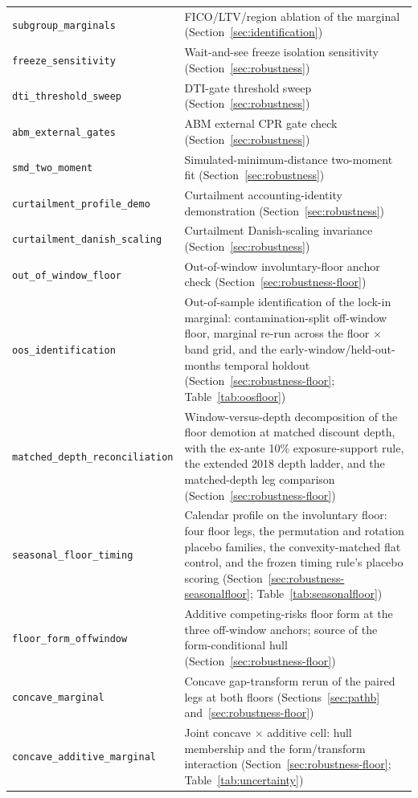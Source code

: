 \documentclass[12pt]{article}
\begin{document}
\begin{table}[H]
\begin{threeparttable}
\begin{tabular}{@{}p{5.4cm}p{8.8cm}@{}}
\texttt{subgroup\_marginals} & FICO/LTV/region ablation of the marginal (Section~\ref{sec:identification}) \\
\texttt{freeze\_sensitivity} & Wait-and-see freeze isolation sensitivity (Section~\ref{sec:robustness}) \\
\texttt{dti\_threshold\_sweep} & DTI-gate threshold sweep (Section~\ref{sec:robustness}) \\
\texttt{abm\_external\_gates} & ABM external CPR gate check (Section~\ref{sec:robustness}) \\
\texttt{smd\_two\_moment} & Simulated-minimum-distance two-moment fit (Section~\ref{sec:robustness}) \\
\texttt{curtailment\_profile\_demo} & Curtailment accounting-identity demonstration (Section~\ref{sec:robustness}) \\
\texttt{curtailment\_danish\_scaling} & Curtailment Danish-scaling invariance (Section~\ref{sec:robustness}) \\
\texttt{out\_of\_window\_floor} & Out-of-window involuntary-floor anchor check (Section~\ref{sec:robustness-floor}) \\
\texttt{oos\_identification} & Out-of-sample identification of the lock-in marginal: contamination-split off-window floor, marginal re-run across the floor $\times$ band grid, and the early-window/held-out-months temporal holdout (Section~\ref{sec:robustness-floor}; Table~\ref{tab:oosfloor}) \\
\texttt{matched\_depth\_reconciliation} & Window-versus-depth decomposition of the floor demotion at matched discount depth, with the ex-ante 10\% exposure-support rule, the extended 2018 depth ladder, and the matched-depth leg comparison (Section~\ref{sec:robustness-floor}) \\
\texttt{seasonal\_floor\_timing} & Calendar profile on the involuntary floor: four floor legs, the permutation and rotation placebo families, the convexity-matched flat control, and the frozen timing rule's placebo scoring (Section~\ref{sec:robustness-seasonalfloor}; Table~\ref{tab:seasonalfloor}) \\
\texttt{floor\_form\_offwindow} & Additive competing-risks floor form at the three off-window anchors; source of the form-conditional hull (Section~\ref{sec:robustness-floor}) \\
\texttt{concave\_marginal} & Concave gap-transform rerun of the paired legs at both floors (Sections~\ref{sec:pathb} and~\ref{sec:robustness-floor}) \\
\texttt{concave\_additive\_marginal} & Joint concave $\times$ additive cell: hull membership and the form/transform interaction (Section~\ref{sec:robustness-floor}; Table~\ref{tab:uncertainty}) \\

\end{tabular}
\end{threeparttable}
\end{table}
\end{document}
